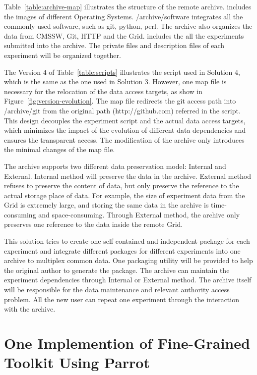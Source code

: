 \documentclass{acm_proc_article-sp}
\begin{document}
Table~\ref{table:archive-map} illustrates the structure of the remote archive.
 includes the images of different Operating Systems.
/archive/software integrates all the commonly used software, such as git,
python, perl. The archive also organizes the data from CMSSW, Git, HTTP and the
Grid.  includes the all the experiments submitted into the
archive. The private files and description files of each experiment will be
organized together.

The Version 4 of Table~\ref{table:scripts} illustrates the script used in
Solution 4, which is the same as the one used in Solution 3. 
However, one map file is necessary for the relocation of the data access targets, as
show in Figure~\ref{fig:version-evolution}. 
The map file redirects the git access path into /archive/git from the original path (http://github.com) referred in the script.
This design decouples the experiment script and the actual data access targets, which minimizes the impact of the evolution of different data dependencies
and ensures the transparent access.
The modification of the archive only introduces the minimal changes of the map file.

The archive supports two different data preservation model: Internal and External. Internal method will preserve the data in the archive. External method refuses to preserve the content of data, but only preserve the reference to the actual storage place of data. For example, the size of experiment data from the Grid is extremely large, and storing the same data in the archive is time-consuming and space-consuming. Through External method, the archive only preserves one reference to the data inside the remote Grid.

This solution tries to create one self-contained and independent package for each experiment and integrate different packages for different experiments into one archive to multiplex common data. One packaging utility  will be provided to help the original author to generate the package. The archive can maintain the experiment dependencies through Internal or External method. The archive itself will be responsible for the data maintenance and relevant authority access problem. All the new user can repeat one experiment through the interaction with the archive.

\section{One Implemention of Fine-Grained Toolkit Using Parrot}
\end{document}
